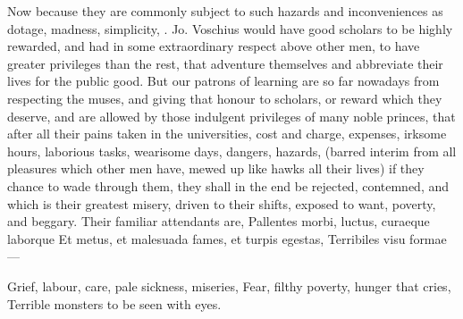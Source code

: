 {{Now because they are commonly subject to such hazards and
inconveniences as dotage, madness, simplicity, \etc{}. Jo. Voschius would
have good scholars to be highly rewarded, and had in some extraordinary
respect above other men, to have greater privileges than the
rest, that adventure themselves and abbreviate their lives for the
public good. But our patrons of learning are so far nowadays from
respecting the muses, and giving that honour to scholars, or reward
which they deserve, and are allowed by those indulgent privileges of
many noble princes, that after all their pains taken in the
universities, cost and charge, expenses, irksome hours, laborious
tasks, wearisome days, dangers, hazards, (barred interim from all
pleasures which other men have, mewed up like hawks all their lives) if
they chance to wade through them, they shall in the end be rejected,
contemned, and which is their greatest misery, driven to their shifts,
exposed to want, poverty, and beggary. Their familiar attendants are,
Pallentes morbi, luctus, curaeque laborque
Et metus, et malesuada fames, et turpis egestas,
Terribiles visu formae---

Grief, labour, care, pale sickness, miseries,
Fear, filthy poverty, hunger that cries,
Terrible monsters to be seen with eyes.

}}
